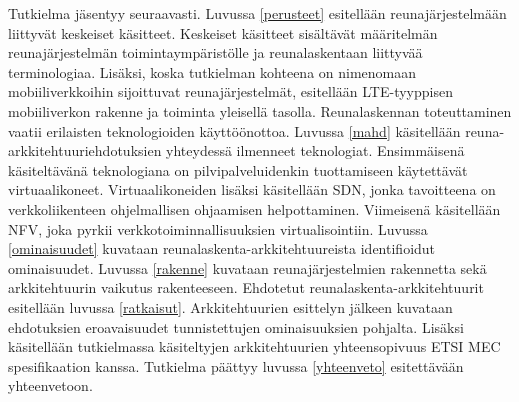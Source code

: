 Tutkielma jäsentyy seuraavasti. Luvussa \ref{perusteet} esitellään reunajärjestelmään liittyvät keskeiset käsitteet. 
Keskeiset käsitteet sisältävät määritelmän reunajärjestelmän toimintaympäristölle ja reunalaskentaan liittyvää terminologiaa.
Lisäksi, koska tutkielman kohteena on nimenomaan mobiiliverkkoihin sijoittuvat reunajärjestelmät, esitellään LTE-tyyppisen mobiiliverkon rakenne ja toiminta yleisellä tasolla.
Reunalaskennan toteuttaminen vaatii erilaisten teknologioiden käyttöönottoa. Luvussa \ref{mahd} käsitellään reuna-arkkitehtuuriehdotuksien yhteydessä ilmenneet teknologiat. Ensimmäisenä käsiteltävänä teknologiana on pilvipalveluidenkin tuottamiseen käytettävät virtuaalikoneet.
Virtuaalikoneiden lisäksi käsitellään SDN, jonka tavoitteena on  verkkoliikenteen ohjelmallisen ohjaamisen helpottaminen. 
Viimeisenä käsitellään NFV, joka pyrkii verkkotoiminnallisuuksien virtualisointiin.
Luvussa \ref{ominaisuudet} kuvataan reunalaskenta\hyp arkkitehtuureista identifioidut ominaisuudet.
Luvussa \ref{rakenne} kuvataan reunajärjestelmien rakennetta sekä arkkitehtuurin vaikutus rakenteeseen.
Ehdotetut reunalaskenta\hyp arkkitehtuurit esitellään luvussa \ref{ratkaisut}. Arkkitehtuurien esittelyn jälkeen kuvataan ehdotuksien eroavaisuudet tunnistettujen ominaisuuksien pohjalta. Lisäksi käsitellään tutkielmassa käsiteltyjen arkkitehtuurien yhteensopivuus ETSI MEC spesifikaation kanssa.
Tutkielma päättyy luvussa \ref{yhteenveto} esitettävään yhteenvetoon.

